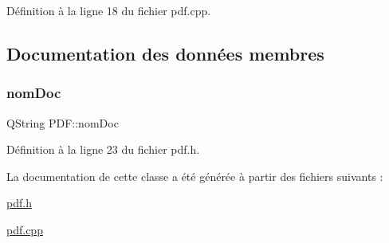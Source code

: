 Définition à la ligne 18 du fichier pdf.\+cpp.



\subsection{Documentation des données membres}
\mbox{\label{class_p_d_f_ab62ed8b5ba6389035dd0aa0455ffd4f2}} 
\subsubsection{\texorpdfstring{nom\+Doc}{nomDoc}}
{\footnotesize\ttfamily Q\+String P\+D\+F\+::nom\+Doc\hspace{0.3cm}{\ttfamily [private]}}



Définition à la ligne 23 du fichier pdf.\+h.



La documentation de cette classe a été générée à partir des fichiers suivants \+:\begin{DoxyCompactItemize}
\item 
\hyperlink{pdf_8h}{pdf.\+h}\item 
\hyperlink{pdf_8cpp}{pdf.\+cpp}\end{DoxyCompactItemize}
